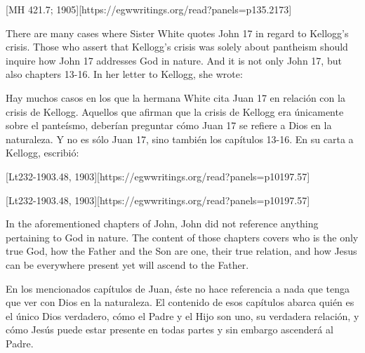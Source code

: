 [MH 421.7; 1905][https://egwwritings.org/read?panels=p135.2173]


There are many cases where Sister White quotes John 17 in regard to Kellogg’s crisis. Those who assert that Kellogg’s crisis was solely about pantheism should inquire how John 17 addresses God in nature. And it is not only John 17, but also chapters 13-16. In her letter to Kellogg, she wrote:


Hay muchos casos en los que la hermana White cita Juan 17 en relación con la crisis de Kellogg. Aquellos que afirman que la crisis de Kellogg era únicamente sobre el panteísmo, deberían preguntar cómo Juan 17 se refiere a Dios en la naturaleza. Y no es sólo Juan 17, sino también los capítulos 13-16. En su carta a Kellogg, escribió:


[Lt232-1903.48, 1903][https://egwwritings.org/read?panels=p10197.57]


[Lt232-1903.48, 1903][https://egwwritings.org/read?panels=p10197.57]


In the aforementioned chapters of John, John did not reference anything pertaining to God in nature. The content of those chapters covers who is the only true God, how the Father and the Son are one, their true relation, and how Jesus can be everywhere present yet will ascend to the Father.


En los mencionados capítulos de Juan, éste no hace referencia a nada que tenga que ver con Dios en la naturaleza. El contenido de esos capítulos abarca quién es el único Dios verdadero, cómo el Padre y el Hijo son uno, su verdadera relación, y cómo Jesús puede estar presente en todas partes y sin embargo ascenderá al Padre.



